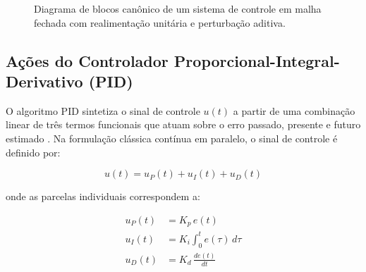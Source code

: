 \begin{figure}[htbp]
    \centering
    \caption{Diagrama de blocos canônico de um sistema de controle em malha fechada com realimentação unitária e perturbação aditiva.}
    \label{fig:diagrama_malha_fechada}
    \vspace{0.1cm}
\end{figure}

\subsection{Ações do Controlador Proporcional-Integral-Derivativo (PID)}
\label{subsec:acoes_pid}

O algoritmo PID sintetiza o sinal de controle $u(t)$ a partir de uma combinação linear de três termos funcionais que atuam sobre o erro passado, presente e futuro estimado \cite{astrom2006, nise2020}. Na formulação clássica contínua em paralelo, o sinal de controle é definido por:

\begin{equation}
    u(t) = u_P(t) + u_I(t) + u_D(t)
    \label{eq:pid_soma}
\end{equation}

\noindent onde as parcelas individuais correspondem a:

\begin{align}
    u_P(t) &= K_p \, e(t) \label{eq:termo_p} \\
    u_I(t) &= K_i \int_{0}^{t} e(\tau) \, d\tau \label{eq:termo_i} \\
    u_D(t) &= K_d \, \frac{de(t)}{dt} \label{eq:termo_d}
\end{align}

